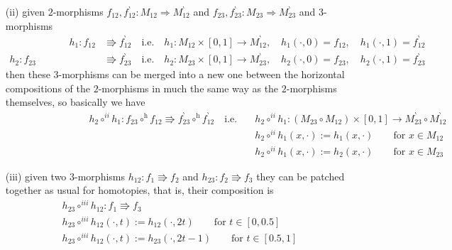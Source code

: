 \begin{enumerate}
\begin{enumerate}
\begin{enumerate}
\item[(ii)]
given $2$-morphisms $f_{12},f_{12}^{\backprime} \colon M_{12} \Rightarrow M_{12}^{\backprime}$ and $f_{23},f_{23}^{\backprime} \colon M_{23} \Rightarrow M_{23}^{\backprime}$ and $3$-morphisms
\begin{align*}
\hspace{6em}
  h_{1}
  \colon
  f_{12}
  &\Rrightarrow
  f_{12}^{\backprime}
  \quad
  \text{i.e.}
  \quad
  h_{1}
  \colon
  M_{12}
  \times
  [0,1]
  \to
  M_{12}^{\backprime}
  ,\quad
  h_{1}(\cdot,0)
  =
  f_{12}
  ,\quad
  h_{1}(\cdot,1)
  =
  f_{12}^{\backprime}
  \\
  h_{2}
  \colon
  f_{23}
  &\Rrightarrow
  f_{23}^{\backprime}
  \quad
  \text{i.e.}
  \quad
  h_{2}
  \colon
  M_{23}
  \times
  [0,1]
  \to
  M_{23}^{\backprime}
  ,\quad
  h_{2}(\cdot,0)
  =
  f_{23}
  ,\quad
  h_{2}(\cdot,1)
  =
  f_{23}^{\backprime}
\end{align*}
then these $3$-morphisms can be merged into a new one between the horizontal compositions of the $2$-morphisms in much the same way as the $2$-morphisms themselves, so basically we have
\begin{align*}
\hspace{8em}
  h_{2}
  \circ^{ii}
  h_{1}
  \colon
  f_{23}
  \circ^{\mathrm{h}}
  f_{12}
  \Rrightarrow
  f_{23}^{\backprime}
  \circ^{\mathrm{h}}
  f_{12}^{\backprime}
  \quad
  \text{i.e.}
  \quad
  &
  h_{2}
  \circ^{ii}
  h_{1}
  \colon
  \left(
    M_{23}
    \circ
    M_{12}
  \right)
  \times
  [0,1]
  \to
  M_{23}^{\backprime}
  \circ
  M_{12}^{\backprime}
  \\
  &
  h_{2}
  \circ^{ii}
  h_{1}
  (x,\cdot)
  :=
  h_{1}(x,\cdot)
  \qquad
  \text{for }
  x
  \in
  M_{12}
  \\
  &
  h_{2}
  \circ^{ii}
  h_{1}
  (x,\cdot)
  :=
  h_{2}(x,\cdot)
  \qquad
  \text{for }
  x
  \in
  M_{23}
\end{align*}

\item[(iii)]
given two $3$-morphisms $h_{12} \colon f_{1} \Rrightarrow f_{2}$ and $h_{23} \colon f_{2} \Rrightarrow f_{3}$ they can be patched together as usual for homotopies, that is, their composition is
\begin{align*}
  &
  h_{23}
  \circ^{iii}
  h_{12}
  \colon
  f_{1}
  \Rrightarrow
  f_{3}
  \\
  &
  h_{23}
  \circ^{iii}
  h_{12}(\cdot,t)
  :=
  h_{12}(\cdot,2t)
  \qquad
  \text{for }
  t
  \in
  [0,0.5]
  \\
  &
  h_{23}
  \circ^{iii}
  h_{12}(\cdot,t)
  :=
  h_{23}(\cdot,2t-1)
  \qquad
  \text{for }
  t
  \in
  [0.5,1]
\end{align*}
\end{enumerate}


\end{enumerate}
\end{enumerate}
